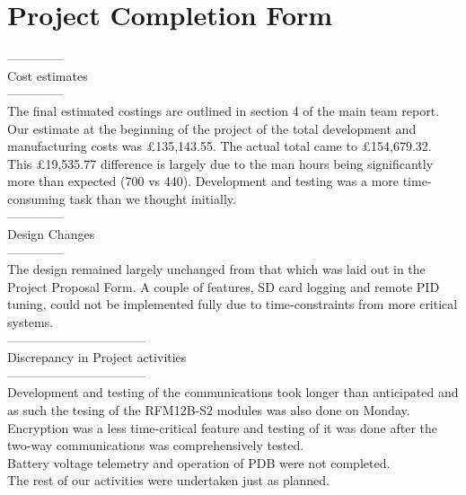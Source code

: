 \documentclass[a4paper,11pt]{article}
\begin{document}
\section{Project Completion Form}
--------------\\
Cost estimates\\
--------------\\
The final estimated costings are outlined in section 4 of the main team report.\\

Our estimate at the beginning of the project of the total development and manufacturing costs was £135,143.55. The actual total came to £154,679.32. This £19,535.77 difference is largely due to the man hours being significantly more than expected (700 vs 440). Development and testing was a more time-consuming task than we thought initially.\\

--------------\\
Design Changes\\
--------------\\
The design remained largely unchanged from that which was laid out in the Project Proposal Form. A couple of features, SD card logging and remote PID tuning, could not be implemented fully due to time-constraints from more critical systems.\\

---------------------------------\\
Discrepancy in Project activities\\
---------------------------------\\
Development and testing of the communications took longer than anticipated and as such the tesing of the RFM12B-S2 modules was also done on Monday. Encryption was a less time-critical feature and testing of it was done after the two-way communications was comprehensively tested.\\

Battery voltage telemetry and operation of PDB were not completed.\\

The rest of our activities were undertaken just as planned.\\
\end{document}
